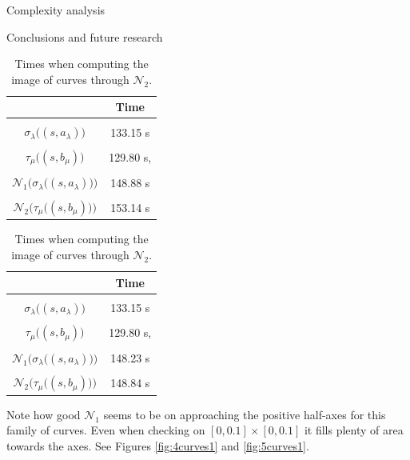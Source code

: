 \documentclass[11pt, a4paper, english, twoside, notitlepage, openright]{report}
\begin{document}
\begin{chapter}{Complexity analysis}
\begin{section}{Conclusions and future research}
\begin{table}[ht!]
\parbox{.45\linewidth}{
\centering
\begin{tabular}{c || c }
 & Time  \\ \hline \hline
\\[-1em]
$\sigma_{\lambda}\big((s, a_\lambda)\big)$ &  133.15 s\\ \hline
\\[-1em]
$\tau_{\mu}\big((s, b_\mu)\big)$ &129.80 s, \\ \hline
\\[-1em]
$\mathcal{N}_1\big(\sigma_{\lambda}\big((s, a_\lambda)\big)\big)$ & 148.88 s \\ \hline
\\[-1em]
$\mathcal{N}_2\big(\tau_{\mu}\big((s, b_\mu)\big)\big)$ & 153.14 s \\
\end{tabular}
\caption[]{Times when computing the image of curves through $\mathcal{N}_1$.}\label{tab:curvesNew1}
}
\hfill
\parbox{.45\linewidth}{
\centering
\begin{tabular}{c || c }
 & Time  \\ \hline \hline
\\[-1em]
$\sigma_{\lambda}\big((s, a_\lambda)\big)$ &  133.15 s\\ \hline
\\[-1em]
$\tau_{\mu}\big((s, b_\mu)\big)$ &129.80 s, \\ \hline
\\[-1em]
$\mathcal{N}_1\big(\sigma_{\lambda}\big((s, a_\lambda)\big)\big)$ & 148.23 s  \\ \hline
\\[-1em]
$\mathcal{N}_2\big(\tau_{\mu}\big((s, b_\mu)\big)\big)$ & 148.84 s \\
\end{tabular}
\caption[]{Times when computing the image of curves through $\mathcal{N}_2$.}\label{tab:curvesNew2}
}
\end{table}

Note how good $\mathcal{N}_1$ seems to be on approaching the positive half-axes for this family of curves. Even when checking on $[0, 0.1]\times[0, 0.1]$ it fills plenty of area towards the axes. See Figures \ref{fig:4curves1} and \ref{fig:5curves1}.


\end{section}
\end{chapter}
\end{document}

